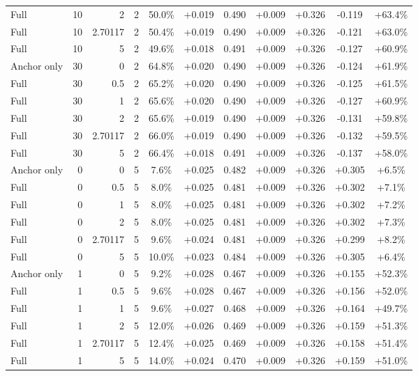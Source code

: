 \begin{table}[htbp]
\begin{tabular}{lrrrccccccc}
Full & 10 & 2 & 2 & 50.0\% & +0.019 & 0.490 & +0.009 & +0.326 & -0.119 & +63.4\% \\
Full & 10 & 2.70117 & 2 & 50.4\% & +0.019 & 0.490 & +0.009 & +0.326 & -0.121 & +63.0\% \\
Full & 10 & 5 & 2 & 49.6\% & +0.018 & 0.491 & +0.009 & +0.326 & -0.127 & +60.9\% \\
Anchor only & 30 & 0 & 2 & 64.8\% & +0.020 & 0.490 & +0.009 & +0.326 & -0.124 & +61.9\% \\
Full & 30 & 0.5 & 2 & 65.2\% & +0.020 & 0.490 & +0.009 & +0.326 & -0.125 & +61.5\% \\
Full & 30 & 1 & 2 & 65.6\% & +0.020 & 0.490 & +0.009 & +0.326 & -0.127 & +60.9\% \\
Full & 30 & 2 & 2 & 65.6\% & +0.019 & 0.490 & +0.009 & +0.326 & -0.131 & +59.8\% \\
Full & 30 & 2.70117 & 2 & 66.0\% & +0.019 & 0.490 & +0.009 & +0.326 & -0.132 & +59.5\% \\
Full & 30 & 5 & 2 & 66.4\% & +0.018 & 0.491 & +0.009 & +0.326 & -0.137 & +58.0\% \\
Anchor only & 0 & 0 & 5 & 7.6\% & +0.025 & 0.482 & +0.009 & +0.326 & +0.305 & +6.5\% \\
Full & 0 & 0.5 & 5 & 8.0\% & +0.025 & 0.481 & +0.009 & +0.326 & +0.302 & +7.1\% \\
Full & 0 & 1 & 5 & 8.0\% & +0.025 & 0.481 & +0.009 & +0.326 & +0.302 & +7.2\% \\
Full & 0 & 2 & 5 & 8.0\% & +0.025 & 0.481 & +0.009 & +0.326 & +0.302 & +7.3\% \\
Full & 0 & 2.70117 & 5 & 9.6\% & +0.024 & 0.481 & +0.009 & +0.326 & +0.299 & +8.2\% \\
Full & 0 & 5 & 5 & 10.0\% & +0.023 & 0.484 & +0.009 & +0.326 & +0.305 & +6.4\% \\
Anchor only & 1 & 0 & 5 & 9.2\% & +0.028 & 0.467 & +0.009 & +0.326 & +0.155 & +52.3\% \\
Full & 1 & 0.5 & 5 & 9.6\% & +0.028 & 0.467 & +0.009 & +0.326 & +0.156 & +52.0\% \\
Full & 1 & 1 & 5 & 9.6\% & +0.027 & 0.468 & +0.009 & +0.326 & +0.164 & +49.7\% \\
Full & 1 & 2 & 5 & 12.0\% & +0.026 & 0.469 & +0.009 & +0.326 & +0.159 & +51.3\% \\
Full & 1 & 2.70117 & 5 & 12.4\% & +0.025 & 0.469 & +0.009 & +0.326 & +0.158 & +51.4\% \\
Full & 1 & 5 & 5 & 14.0\% & +0.024 & 0.470 & +0.009 & +0.326 & +0.159 & +51.0\% \\

\end{tabular}
\end{table}
